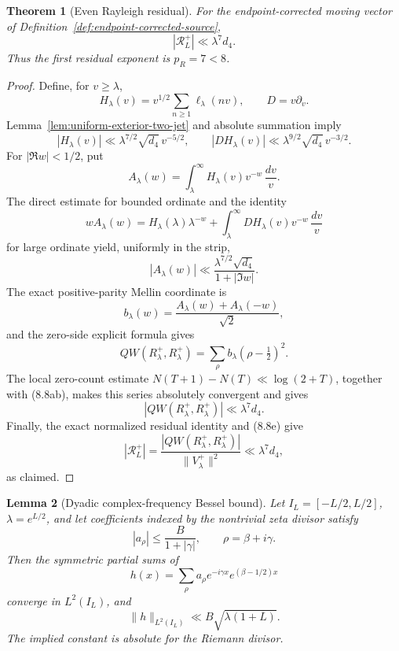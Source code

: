 \documentclass[11pt]{amsart}
\newtheorem{theorem}{Theorem}[section]
\newtheorem{lemma}[theorem]{Lemma}
\theoremstyle{definition}
\theoremstyle{remark}
\begin{document}
\begin{theorem}[Even Rayleigh residual]
\label{thm:even-rayleigh-residual}
For the endpoint-corrected moving vector of
Definition~\ref{def:endpoint-corrected-source},
\[
 \boxed{|\mathscr R_L^+|\ll\lambda^7d_4.}
\tag{8.8w}
\]
Thus the first residual exponent is \(p_R=7<8\).
\end{theorem}

\begin{proof}
Define, for \(v\ge\lambda\),
\[
 H_\lambda(v)=v^{1/2}\sum_{n\ge1}\ell_\lambda(nv),
 \qquad D=v\partial_v.
\tag{8.8x}
\]
Lemma~\ref{lem:uniform-exterior-two-jet} and absolute summation imply
\[
 |H_\lambda(v)|\ll
 \lambda^{7/2}\sqrt{d_4}\,v^{-5/2},
 \qquad
 |DH_\lambda(v)|\ll
 \lambda^{9/2}\sqrt{d_4}\,v^{-3/2}.
\tag{8.8y}
\]
For \(|\Re w|<1/2\), put
\[
 A_\lambda(w)=\int_\lambda^\infty
 H_\lambda(v)v^{-w}\,\frac{dv}{v}.
\tag{8.8z}
\]
The direct estimate for bounded ordinate and the identity
\[
 wA_\lambda(w)
 =H_\lambda(\lambda)\lambda^{-w}
 +\int_\lambda^\infty
 DH_\lambda(v)v^{-w}\,\frac{dv}{v}
\tag{8.8aa}
\]
for large ordinate yield, uniformly in the strip,
\[
 |A_\lambda(w)|
 \ll\frac{\lambda^{7/2}\sqrt{d_4}}
          {1+|\Im w|}.
\tag{8.8ab}
\]
The exact positive-parity Mellin coordinate is
\[
 b_\lambda(w)=
 \frac{A_\lambda(w)+A_\lambda(-w)}{\sqrt2},
\tag{8.8ac}
\]
and the zero-side explicit formula gives
\[
 QW(R_\lambda^+,R_\lambda^+)
 =\sum_\rho b_\lambda(\rho-\tfrac12)^2.
\tag{8.8ad}
\]
The local zero-count estimate \(N(T+1)-N(T)\ll\log(2+T)\), together
with (8.8ab), makes this series absolutely convergent and gives
\[
 |QW(R_\lambda^+,R_\lambda^+)|
 \ll\lambda^7d_4.
\tag{8.8ae}
\]
Finally, the exact normalized residual identity and (8.8e) give
\[
 |\mathscr R_L^+|
 =\frac{|QW(R_\lambda^+,R_\lambda^+)|}
        {\|V_\lambda^+\|^2}
 \ll\lambda^7d_4,
\]
as claimed.
\end{proof}

\begin{lemma}[Dyadic complex-frequency Bessel bound]
\label{lem:dyadic-complex-bessel}
Let \(I_L=[-L/2,L/2]\), \(\lambda=e^{L/2}\), and let coefficients indexed
by the nontrivial zeta divisor satisfy
\[
 |a_\rho|\le \frac{B}{1+|\gamma|},
 \qquad \rho=\beta+i\gamma .
\tag{8.8af}
\]
Then the symmetric partial sums of
\[
 h(x)=\sum_\rho a_\rho
 e^{-i\gamma x}e^{(\beta-1/2)x}
\tag{8.8ag}
\]
converge in \(L^2(I_L)\), and
\[
 \boxed{\|h\|_{L^2(I_L)}
 \ll B\sqrt{\lambda(1+L)}.}
\tag{8.8ah}
\]
The implied constant is absolute for the Riemann divisor.
\end{lemma}
\end{document}
